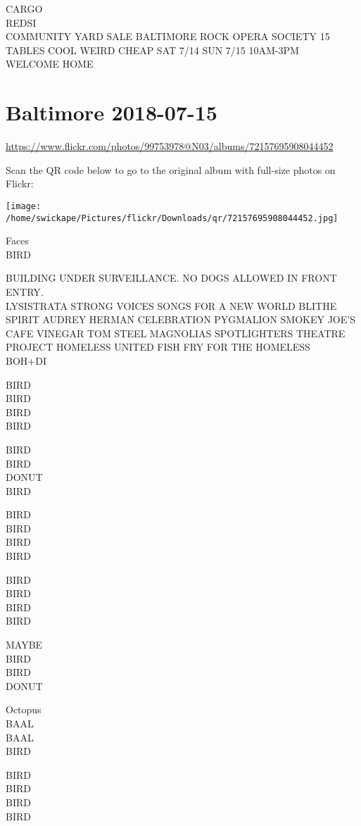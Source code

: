 \documentclass[10pt,letterpaper]{article}
\begin{document}
CARGO\\
REDSI\\
COMMUNITY YARD SALE BALTIMORE ROCK OPERA SOCIETY 15 TABLES COOL WEIRD CHEAP SAT 7/14 SUN 7/15 10AM{-}3PM\\
WELCOME HOME


\section*{Baltimore 2018-07-15}

\url{https://www.flickr.com/photos/99753978@N03/albums/72157695908044452}

Scan the QR code below to go to the original album with full-size photos on Flickr:

\texttt{[image: /home/swickape/Pictures/flickr/Downloads/qr/72157695908044452.jpg]}


Faces\\
BIRD

BUILDING UNDER SURVEILLANCE.  NO DOGS ALLOWED IN FRONT ENTRY.\\
LYSISTRATA STRONG VOICES SONGS FOR A NEW WORLD BLITHE SPIRIT AUDREY HERMAN CELEBRATION PYGMALION SMOKEY JOE'S CAFE VINEGAR TOM STEEL MAGNOLIAS SPOTLIGHTERS THEATRE\\
PROJECT HOMELESS UNITED FISH FRY FOR THE HOMELESS\\
BOH+DI

BIRD\\
BIRD\\
BIRD\\
BIRD

BIRD\\
BIRD\\
DONUT\\
BIRD

BIRD\\
BIRD\\
BIRD\\
BIRD

BIRD\\
BIRD\\
BIRD\\
BIRD

MAYBE\\
BIRD\\
BIRD\\
DONUT

Octopus\\
BAAL\\
BAAL\\
BIRD

BIRD\\
BIRD\\
BIRD\\
BIRD
\end{document}

